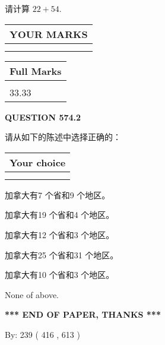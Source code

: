 \documentclass{ctexart}
\begin{document}
  
 
请计算 $ %
22 +  %
54 $.
 

 

 
  
\vspace{0.2in}
  
\noindent\begin{tabular}{|l|}
\hline
 YOUR MARKS  \\
\hline
 \\ 
 \\ 
\hline
\end{tabular}
\hspace{0.05in} \begin{tabular}{|l|}
\hline
 Full Marks  \\
\hline
 \\ 
33.33 \\
\hline
\end{tabular}
{\textbf{\Large{QUESTION
574.2 
}}}
  
  
请从如下的陈述中选择正确的：
  
  
\noindent\hspace{3.0in} \begin{tabular}{|l|}
\hline
Your choice \\
\hline
 \\ 
 \\ 
\hline
\end{tabular}
  
  
 
 
加拿大有7 个省和9 个地区。
 
 
加拿大有19 个省和4 个地区。
 
 
加拿大有12 个省和3 个地区。
 
 
加拿大有25 个省和31 个地区。
 
 
加拿大有10 个省和3 个地区。
 
 
 None of above.
 
 
   
   
 \vspace{0.2in}
 
   
   
   
   
\vspace{1.0in} 
{\textbf{\large{ *** END OF PAPER, THANKS *** }}} 
   
   
\hspace{1.0in} By: 
 239 ( 416 ,  613 )
   
\end{document}
